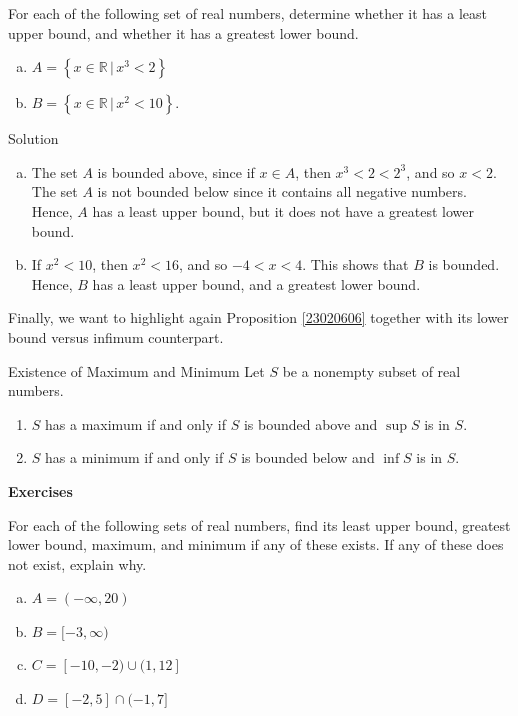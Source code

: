 \begin{example}{}
For each of the following set of real numbers, determine whether it has a least upper bound, and whether it has a greatest lower bound.  
\begin{enumerate}[(a)]
\item $A=\left\{x\in\mathbb{R}\,|\, x^3<2\right\}$
\item $B=\left\{x\in\mathbb{R}\,|\, x^2<10\right\}$.
\end{enumerate}
\end{example}
\begin{solution}{Solution}
\begin{enumerate}[(a)]
\item The set $A$ is bounded above, since if $x\in A$, then $x^3<2<2^3$, and so $x<2$. The set $A$ is not bounded below since it contains all negative numbers. Hence, $A$ has a least upper bound, but it does not have a greatest lower bound.
\item If $x^2<10$, then $x^2<16$, and so $-4<x<4$. This shows that $B$ is bounded. Hence, $B$ has a least upper bound, and a greatest lower bound.
\end{enumerate}
\end{solution}

Finally, we want to highlight again Proposition \ref{23020606} together with its lower bound versus infimum counterpart.
\begin{highlight}{Existence of Maximum and Minimum}
Let $S$ be a nonempty subset of real numbers. 
\begin{enumerate}[1.]
\item $S$ has a maximum if and only if $S$ is bounded above and $\sup S$ is in $S$.
\item $S$ has a minimum if and only if $S$ is bounded below and $\inf S$ is in $S$.
\end{enumerate}
\end{highlight}
\vp
 
\noindent
{\bf \large Exercises  \thesection}
\setcounter{myquestion}{1}

 \begin{question}{\themyquestion}
For each of the following sets of real numbers, find its least upper bound,   greatest lower bound,  maximum, and minimum if any of these  exists. If any of these does not exist, explain why.
\begin{enumerate}[(a)]
\item
$A=(-\infty, 20)$
\item $B=[-3, \infty)$
\item $C=[-10, -2)\cup (1, 12]$
\item $D=[-2, 5]\cap (-1, 7]$
\end{enumerate}
\end{question}

